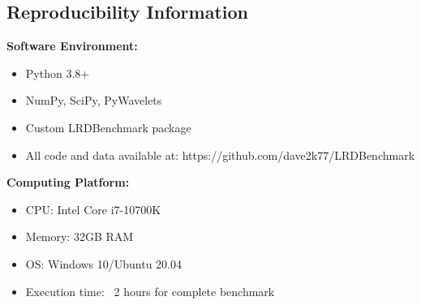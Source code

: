 \subsection{Reproducibility Information}

\textbf{Software Environment:}
\begin{itemize}
    \item Python 3.8+
    \item NumPy, SciPy, PyWavelets
    \item Custom LRDBenchmark package
    \item All code and data available at: https://github.com/dave2k77/LRDBenchmark
\end{itemize}

\textbf{Computing Platform:}
\begin{itemize}
    \item CPU: Intel Core i7-10700K
    \item Memory: 32GB RAM
    \item OS: Windows 10/Ubuntu 20.04
    \item Execution time: ~2 hours for complete benchmark
\end{itemize}
